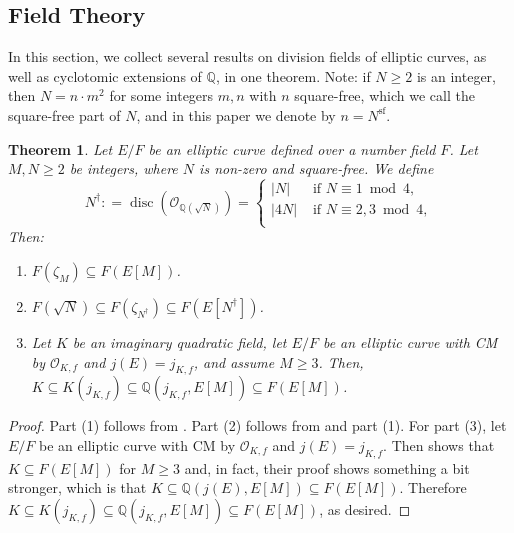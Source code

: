 \documentclass[11pt]{amsart}
\newtheorem{theorem}[defn]{Theorem}
\theoremstyle{definition}
\newcommand{\Q}{\mathbb{Q}}
\newcommand{\OO}{\mathcal{O}}
\begin{document}
\subsection{Field Theory}\label{sec-fieldtheory}

 In this section, we collect several results on division fields of elliptic curves, as well as cyclotomic extensions of $\Q$, in one theorem. Note: if $N\geq 2$ is an integer, then $N=n\cdot m^2$ for some integers $m,n$ with $n$ square-free, which we call the square-free part of $N$, and in this paper we denote by $n=N^\text{sf}$.



\begin{theorem}\label{cyc-division-thm}\label{kronecker-weber}\label{sqrt-general}\label{lem-clark}
    Let $E/F$ be an elliptic curve defined over a number field $F$. Let $M, N \geq 2$ be integers, where $N$ is non-zero and square-free. We define
    \[ N^{\dagger} : = \operatorname{disc}(\mathcal{O}_{\Q(\sqrt{N})}) =  
\begin{cases}
|N| & \text{ if } N \equiv 1 \bmod 4, \\
|4N| & \text{ if } N \equiv 2,3 \bmod 4, \\
\end{cases} \]
    Then:
    \begin{enumerate}
        \item  $F(\zeta_M) \subseteq F(E[M])$.
        \item $F(\sqrt{N}) \subseteq F(\zeta_{N^\dagger})\subseteq F(E[N^{\dagger}])$. 
        \item Let $K$ be an imaginary quadratic field, let $E/F$ be an elliptic curve with CM by $\OO_{K,f}$ and $j(E)=j_{K,f}$, and assume $M \geq 3$. Then,  $K\subseteq K(j_{K,f})\subseteq \Q(j_{K,f},E[M]) \subseteq F(E[M])$.
    \end{enumerate} 
\end{theorem}

\begin{proof}
    Part (1) follows from \cite[Ch. III, Corollary 8.1.1]{silverman1}. Part (2) follows from \cite[Ch. 2, Exercise 8]{marcus2018number} and part (1). For part (3), let $E/F$ be an elliptic curve with CM by $\mathcal{O}_{K,f}$ and $j(E)=j_{K,f}$. Then \cite[Lemma 3.15]{bourdon4} shows that $K\subseteq F(E[M])$ for $M \geq 3$ and, in fact, their proof shows something a bit stronger, which is that $K\subseteq \Q(j(E),E[M])\subseteq F(E[M])$. Therefore $K\subseteq K(j_{K,f})\subseteq \Q(j_{K,f},E[M]) \subseteq F(E[M])$, as desired.
\end{proof}
\end{document}
